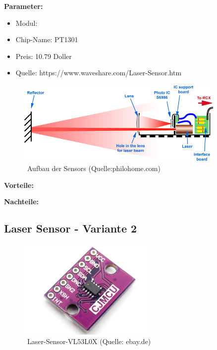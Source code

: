 \textbf{Parameter:}  %
\begin{itemize}
\item Modul: 
\item Chip-Name: PT1301
\item Preis: 10.79 Doller
\item Quelle: https://www.waveshare.com/Laser-Sensor.htm
\end{itemize}
\begin{figure}[!h]  %
	\centering\includegraphics[width=0.9\textwidth]{images/laser-sensor1.png}
	\caption{ \ Aufbau der Sensors (Quelle:philohome.com)}
	\label{laser-sensor1} %
\end{figure}

\par\bigskip %
\textbf{Vorteile:}  %

\par\bigskip %
\textbf{Nachteile:}  %




\pagebreak

\subsection{Laser Sensor - Variante 2}
\begin{figure}[htbp!]  %
	\centering\includegraphics[width=0.6\textwidth]{images/laser-sensor_v2.png}
	\caption{ \ Laser-Sensor-VL53L0X (Quelle: ebay.de)}
	\label{laser-sensor_v2} %
\end{figure}

